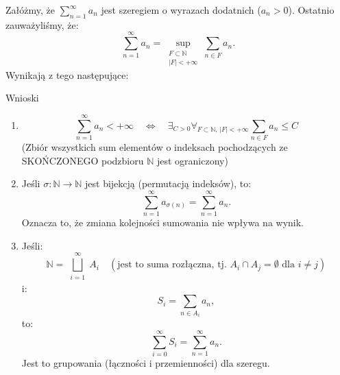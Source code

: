\documentclass{article}
\newcommand{\N}{\mathbb{N}}
\newcommand{\oo}{\infty}
\begin{document}
    Załóżmy, że $\sum_{n=1}^{\infty} a_n$ jest szeregiem o wyrazach dodatnich ($a_n > 0$). Ostatnio zauważyliśmy, że:
    \[\sum\limits_{n=1}^{\infty} a_n = \sup_{\substack{F \subset \N \\ |F| < +\infty}} \sum_{n \in F} a_n.\]
    Wynikają z tego następujące:
    \begin{twier}{Wnioski}
        \begin{enumerate}
            \item \[\sum_{n = 1}^{\infty} a_n < + \infty \quad \iff \quad \exists_{C>0} \forall_{F \subset \N ,\, |F| < +\oo}  \sum_{n \in F} a_n \leqslant C\]
            (Zbiór wszystkich sum elementów o indeksach pochodzących ze SKOŃCZONEGO podzbioru $\N$ jest ograniczony)
            \item Jeśli $\sigma : \N \rightarrow \N$ jest bijekcją (permutacją indeksów), to:
            \[\sum_{n=1}^{\oo} a_{\sigma(n)} = \sum_{n=1}^{\oo} a_{n}.\]
            Oznacza to, że zmiana kolejności sumowania nie wpływa na wynik.
            \item Jeśli:
            \[\N = \bigsqcup_{\substack{i=1}}^{\oo} A_i \quad (\text{jest to suma rozłączna, tj. } A_i \cap A_j = \emptyset \text{ dla } i \neq j)\]
            i:
            \[S_i = \sum_{n \in A_i} a_n,\]
            to:
            \[\sum_{i=0}^{\oo}S_i  = \sum_{n=1}^{\oo}a_n.  \]
            Jest to grupowania (łączności i przemienności) dla szeregu.
        \end{enumerate}
    \end{twier}
\end{document}
